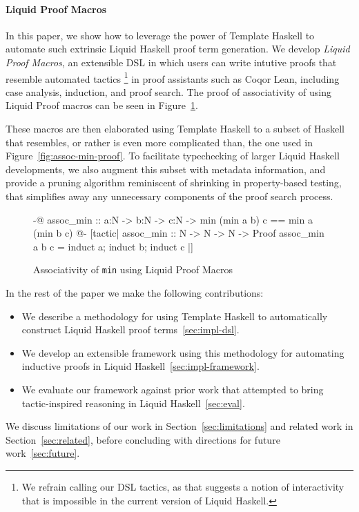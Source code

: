 \paragraph*{Liquid Proof Macros}

In this paper, we show how to leverage the power of Template Haskell
to automate such extrinsic Liquid Haskell proof term generation.  We
develop {\em Liquid Proof Macros}, an extensible DSL in which users
can write intutive proofs that resemble automated tactics%
\footnote{We refrain calling our DSL tactics, as that suggests a
  notion of interactivity that is impossible in the current version
  of Liquid Haskell.}%
%
in proof assistants such as Coq\cn or Lean\cn, including case
analysis, induction, and proof search. The proof of associativity of
 using Liquid Proof macros can be seen in
Figure~\ref{fig:assoc-min-macro}.

These macros are then elaborated using Template Haskell to a subset of
Haskell that resembles, or rather is even more complicated than, the
one used in Figure~\ref{fig:assoc-min-proof}. To facilitate
typechecking of larger Liquid Haskell developments, we also augment
this subset with metadata information, and provide a pruning algorithm
reminiscent of shrinking in property-based testing\cn, that simplifies
away any unnecessary components of the proof search process.


\begin{figure}[t]
\begin{code}
  {-@ assoc_min :: a:N -> b:N -> c:N ->
        {min (min a b) c == min a (min b c)} @-}
  [tactic|
    assoc_min :: N -> N -> N -> Proof
    assoc_min a b c = induct a; induct b; induct c
  |]
\end{code}
\caption{Associativity of \texttt{min} using Liquid Proof Macros}
\label{fig:assoc-min-macro}
\end{figure}

In the rest of the paper we make the following contributions:
\begin{itemize}
\item We describe a methodology for using Template Haskell to automatically construct Liquid Haskell proof terms~\ref{sec:impl-dsl}.
\item We develop an extensible framework using this methodology for automating inductive proofs in Liquid Haskell~\ref{sec:impl-framework}.
\item We evaluate our framework against prior work that attempted to
  bring tactic-inspired reasoning in Liquid Haskell~\ref{sec:eval}.
\end{itemize}
We discuss limitations of our work in Section~\ref{sec:limitations}
and related work in Section~\ref{sec:related}, before concluding with
directions for future work~\ref{sec:future}.


